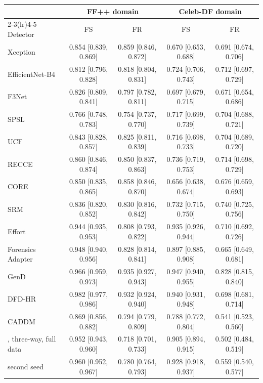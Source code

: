 \begin{tabular}{@{}l cccc@{}}
\toprule
 & \multicolumn{2}{c}{FF++ domain} & \multicolumn{2}{c}{Celeb-DF domain} \\
\cmidrule(lr){2-3}\cmidrule(lr){4-5}
Detector & FS & FR & FS & FR \\
\midrule
Xception~\cite{xception} & 0.854 [0.839, 0.869] & 0.859 [0.846, 0.872] & 0.670 [0.653, 0.688] & 0.691 [0.674, 0.706] \\
EfficientNet-B4~\cite{efficientnet} & 0.812 [0.796, 0.828] & 0.818 [0.804, 0.831] & 0.724 [0.706, 0.743] & 0.712 [0.697, 0.729] \\
F3Net~\cite{f3net} & 0.826 [0.809, 0.841] & 0.797 [0.782, 0.811] & 0.697 [0.679, 0.715] & 0.671 [0.654, 0.686] \\
SPSL~\cite{spsl} & 0.766 [0.748, 0.783] & 0.754 [0.737, 0.770] & 0.717 [0.699, 0.739] & 0.704 [0.688, 0.721] \\
UCF~\cite{ucf} & 0.843 [0.828, 0.857] & 0.825 [0.811, 0.839] & 0.716 [0.698, 0.733] & 0.704 [0.689, 0.720] \\
RECCE~\cite{recce} & 0.860 [0.846, 0.874] & 0.850 [0.837, 0.863] & 0.736 [0.719, 0.753] & 0.714 [0.698, 0.729] \\
CORE~\cite{core} & 0.850 [0.835, 0.865] & 0.858 [0.846, 0.870] & 0.656 [0.638, 0.674] & 0.676 [0.659, 0.693] \\
SRM~\cite{srm} & 0.836 [0.820, 0.852] & 0.830 [0.816, 0.842] & 0.732 [0.715, 0.750] & 0.740 [0.725, 0.756] \\
Effort~\cite{effort} & 0.944 [0.935, 0.953] & 0.808 [0.793, 0.822] & 0.935 [0.926, 0.944] & 0.710 [0.692, 0.726] \\
Forensics Adapter~\cite{forensicsadapter} & 0.948 [0.940, 0.956] & 0.828 [0.814, 0.841] & 0.897 [0.885, 0.908] & 0.665 [0.649, 0.681] \\
GenD~\cite{gend2026} & 0.966 [0.959, 0.973] & 0.935 [0.927, 0.943] & 0.947 [0.940, 0.955] & 0.828 [0.815, 0.840] \\
DFD-HR~\cite{dfdhr2026} & 0.982 [0.977, 0.986] & 0.932 [0.924, 0.940] & 0.940 [0.931, 0.948] & 0.698 [0.681, 0.714] \\
CADDM~\cite{caddm} & 0.869 [0.856, 0.882] & 0.794 [0.779, 0.809] & 0.788 [0.772, 0.804] & 0.541 [0.523, 0.560] \\
\midrule
\ours{}, three-way, full data & 0.952 [0.943, 0.960] & 0.718 [0.701, 0.733] & 0.905 [0.894, 0.915] & 0.502 [0.484, 0.519] \\
\quad second seed & 0.960 [0.952, 0.967] & 0.780 [0.764, 0.793] & 0.928 [0.918, 0.937] & 0.559 [0.540, 0.577] \\

\end{tabular}
